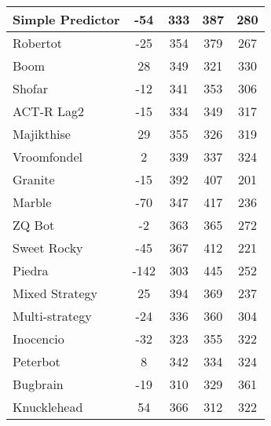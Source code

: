 \begin{table*}
\begin{tabular}{|l|c|c|c|c|}
Simple Predictor & -54 & 333 & 387 & 280 \\ \hline 
Robertot & -25 & 354 & 379 & 267 \\ \hline 
Boom & 28 & 349 & 321 & 330 \\ \hline 
Shofar & -12 & 341 & 353 & 306 \\ \hline 
ACT-R Lag2 & -15 & 334 & 349 & 317 \\ \hline 
Majikthise & 29 & 355 & 326 & 319 \\ \hline 
Vroomfondel & 2 & 339 & 337 & 324 \\ \hline 
Granite & -15 & 392 & 407 & 201 \\ \hline 
Marble & -70 & 347 & 417 & 236 \\ \hline 
ZQ Bot & -2 & 363 & 365 & 272 \\ \hline 
Sweet Rocky & -45 & 367 & 412 & 221 \\ \hline 
Piedra & -142 & 303 & 445 & 252 \\ \hline 
Mixed Strategy & 25 & 394 & 369 & 237 \\ \hline 
Multi-strategy & -24 & 336 & 360 & 304 \\ \hline 
Inocencio & -32 & 323 & 355 & 322 \\ \hline 
Peterbot & 8 & 342 & 334 & 324 \\ \hline 
Bugbrain & -19 & 310 & 329 & 361 \\ \hline 
Knucklehead & 54 & 366 & 312 & 322 \\ \hline
        \end{tabular}
    \end{table*}